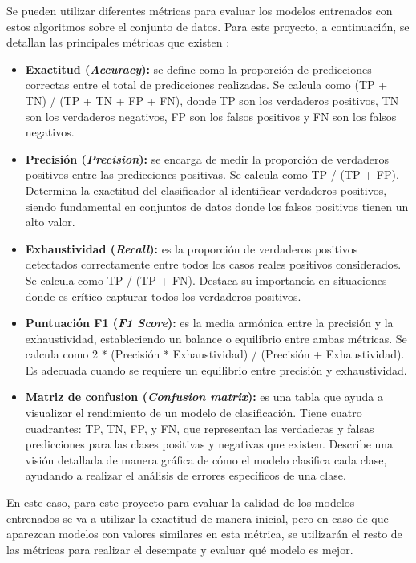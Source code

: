 Se pueden utilizar diferentes métricas para evaluar los modelos entrenados con estos algoritmos sobre el conjunto de datos. Para este proyecto, a continuación, se detallan las principales métricas que existen \cite{metricas}:

\begin{itemize}
    \item \textbf{Exactitud (\textit{Accuracy}):} se define como la proporción de predicciones correctas entre el total de predicciones realizadas. Se calcula como (TP + TN) / (TP + TN + FP + FN), donde TP son los verdaderos positivos, TN son los verdaderos negativos, FP son los falsos positivos y FN son los falsos negativos. 
    \item \textbf{Precisión (\textit{Precision}):} se encarga de medir la proporción de verdaderos positivos entre las predicciones positivas. Se calcula como TP / (TP + FP). Determina la exactitud del clasificador al identificar verdaderos positivos, siendo fundamental en conjuntos de datos donde los falsos positivos tienen un alto valor.
    \item \textbf{Exhaustividad (\textit{Recall}):} es la proporción de verdaderos positivos detectados correctamente entre todos los casos reales positivos considerados. Se calcula como TP / (TP + FN). Destaca su importancia en situaciones donde es crítico capturar todos los verdaderos positivos.
    \item \textbf{Puntuación F1 (\textit{F1 Score}):} es la media armónica entre la precisión y la exhaustividad, estableciendo un balance o equilibrio entre ambas métricas. Se calcula como 2 * (Precisión * Exhaustividad) / (Precisión + Exhaustividad). Es adecuada cuando se requiere un equilibrio entre precisión y exhaustividad.
    \item \textbf{Matriz de confusion (\textit{Confusion matrix}):} es una tabla que ayuda a visualizar el rendimiento de un modelo de clasificación. Tiene cuatro cuadrantes: TP, TN, FP, y FN, que representan las verdaderas y falsas predicciones para las clases positivas y negativas que existen. Describe una visión detallada de manera gráfica de cómo el modelo clasifica cada clase, ayudando a realizar el análisis de errores específicos de una clase.
\end{itemize}

En este caso, para este proyecto para evaluar la calidad de los modelos entrenados se va a utilizar la exactitud de manera inicial, pero en caso de que aparezcan modelos con valores similares en esta métrica, se utilizarán el resto de las métricas para realizar el desempate y evaluar qué modelo es mejor.



